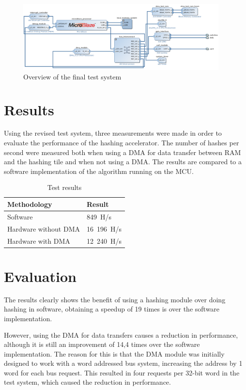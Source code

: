 \begin{figure}
	\includegraphics[width=0.95\textwidth]{Figures/testsystem-vivado-final.png}
	\caption{Overview of the final test system}
	\label{fig:testsystem-vivado-final}
\end{figure}

\section{Results}

Using the revised test system, three measurements were made in order to evaluate the
performance of the hashing accelerator. The number of hashes per second were measured
both when using a DMA for data transfer between RAM and the hashing tile and when not
using a DMA. The results are compared to a software implementation of the algorithm
running on the MCU.

\begin{table}[ht]
	\centering
	\begin{tabular}{|l|l|}
		\hline
		\textbf{Methodology} & \textbf{Result} \\
		\hline
		Software & 849~H/s \\
		Hardware without DMA & 16~196~H/s\\
		Hardware with DMA & 12~240~H/s\\
		\hline
	\end{tabular}

	\caption{Test results}
\end{table}

\section{Evaluation}

The results clearly shows the benefit of using a hashing module over doing hashing in software,
obtaining a speedup of 19 times is over the software implementation.

However, using the DMA for data transfers causes a reduction in performance, although it is still
an improvement of 14,4 times over the software implementation. The reason for this is that the
DMA module was initially designed to work with a word addressed bus system, increasing the
address by 1 word for each bus request. This resulted in four requests per 32-bit word in
the test system, which caused the reduction in performance.

